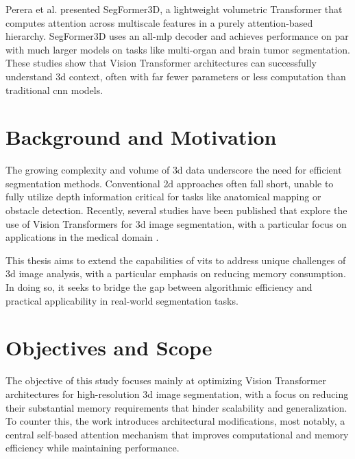 \medskip

Perera et al. \cite{perera2024segformer3defficienttransformer3d} presented SegFormer3D, a lightweight volumetric Transformer that computes attention across multiscale features in a purely attention-based hierarchy. SegFormer3D uses an all-\gls{mlp} decoder and achieves performance on par with much larger models on tasks like multi-organ and brain tumor segmentation. These studies show that Vision Transformer architectures can successfully understand \gls{3d} context, often with far fewer parameters or less computation than traditional \gls{cnn} models.


\section{Background and Motivation}
The growing complexity and volume of \gls{3d} data underscore the need for efficient segmentation methods. Conventional \gls{2d} approaches often fall short, unable to fully utilize depth information critical for tasks like anatomical mapping or obstacle detection. Recently, several studies have been published that explore the use of Vision Transformers for \gls{3d} image segmentation, with a particular focus on applications in the medical domain \cite{das2025vivitvariableinputvisiontransformer, gan20243deffivitcaps3defficientvision, jollans2024visiontransformersincreaseefficiency}.  

\medskip

This thesis aims to extend the capabilities of \glspl{vit} to address unique challenges of \gls{3d} image analysis, with a particular emphasis on reducing memory consumption. In doing so, it seeks to bridge the gap between algorithmic efficiency and practical applicability in real-world segmentation tasks.


\section{Objectives and Scope}
The objective of this study focuses mainly at optimizing Vision Transformer architectures for high-resolution \gls{3d} image segmentation, with a focus on reducing their substantial memory requirements that hinder scalability and generalization. To counter this, the work introduces architectural modifications, most notably, a central self-based attention mechanism that improves computational and memory efficiency while maintaining performance.

\medskip

